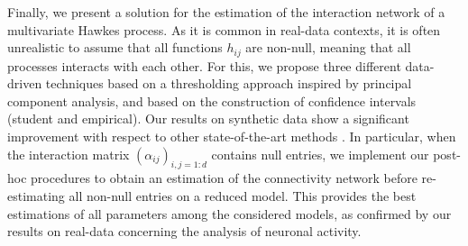       Finally, we present a solution for the estimation of the interaction network of a multivariate Hawkes process.
      As it is common in real-data contexts, it is often unrealistic to assume that all functions $h_{ij}$ are non-null, meaning that all processes interacts with each other.
      For this, we propose three different data-driven techniques based on a thresholding approach inspired by principal component analysis, and based on the construction of confidence intervals (student and empirical).
      Our results on synthetic data show a significant improvement with respect to other state-of-the-art methods \parencite{Lemonnier2014, Bacry2020}.
      In particular, when the interaction matrix $(\alpha_{ij})_{i,j=1:d}$ contains null entries, we implement our post-hoc procedures to obtain an estimation of the connectivity network before re-estimating all non-null entries on a reduced model.
      This provides the best estimations of all parameters among the considered models, as confirmed by our results on real-data concerning the analysis of neuronal activity.

      

